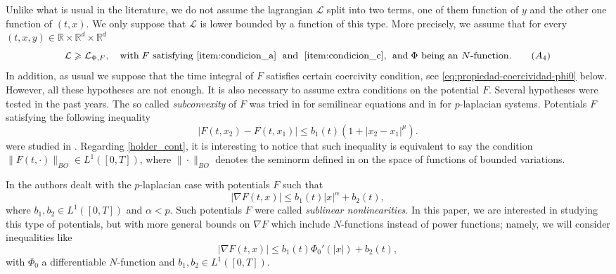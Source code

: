 \documentclass[twoside]{elsarticle}
\theoremstyle{remark}
\newcommand{\rr}{\mathbb{R}}
\renewcommand{\leq}{\leqslant}
\renewcommand{\geq}{\geqslant}
\begin{document}
 Unlike what is usual in the literature, we do not assume the lagrangian $\mathcal{L}$  split into two terms, 
one of them function of $y$ and the other one function of $(t,x)$. 
We only suppose that $\mathcal{L}$ is lower bounded by a function of this type. More precisely, we assume that for every $(t,x,y)\in\rr\times\rr^d\times\rr^d$
%
\begin{equation}\label{eq:control_inf}
\mathcal{L} \geq \mathcal{L}_{\Phi,F},\quad \text{with}\;F\text{ satisfying \ref{item:condicion_a} \;and\; \ref{item:condicion_c},  
\;\text{and}\;$\Phi$ being an $N$-function}.\tag{$A_4$}
\end{equation}
%
In addition, as usual we suppose that the time integral of $F$ satisfies certain coercivity condition, see \eqref{eq:propiedad-coercividad-phi0} below.  However,  all these hypotheses are not enough. It is also necessary to assume extra conditions on the potential $F$.
Several hypotheses were tested in the past years. The so called \emph{subconvexity} of $F$ was tried in \cite{wu1999periodic,tang1995periodic,zhao2004periodic} for semilinear equations and in \cite{xu2007some,tang2010periodic} for $p$-laplacian systems. Potentials $F$ satisfying the following inequality
\begin{equation}\label{holder_cont}
  \left| F(t,x_2)- F(t,x_1) \right|\leq b_1(t)(1+|x_2-x_1|^{\mu}).
\end{equation}
 were studied in \cite{ABGMS2015}. 
Regarding \eqref{holder_cont}, it is interesting to notice that such inequality is equivalent to say the condition
$\|F(t,\cdot)\|_{BO}\in L^1([0,T])$, where $\|\cdot\|_{BO}$ denotes the seminorm defined in  \cite[p. 125]{zhu2012analysis} on the space of functions of bounded variations.
 
 
 In \cite{tang1998periodic, tang2010periodic} the authors  dealt with the $p$-laplacian case 
with potentials $F$ such that  
\begin{equation}\label{eq:cota_pot} |\nabla F(t,x)|\leq b_1(t)|x|^{\alpha}+b_2(t),
 \end{equation}
where  $b_1,b_2 \in L^1([0,T])$ and $\alpha<p$. Such potentials $F$ 
were called  \emph{sublinear nonlinearities}. In this paper, we are interested in studying this type of potentials, 
but with more general bounds on $\nabla F$ which include $N$-functions instead of power functions; 
namely, we will consider inequalities like
\begin{equation}\label{holder_cont-mu}
  \left| \nabla F(t,x) \right|\leq b_1(t)\Phi_0'(|x|)+b_2(t),
  \tag{$A_5$}
\end{equation}
with $\Phi_0$  a differentiable $N$-function and $b_1,b_2 \in L^1([0,T])$.
\end{document}

